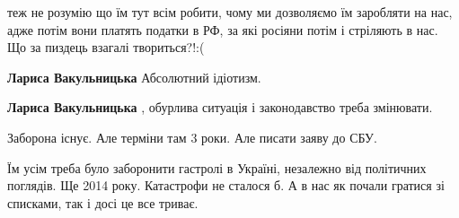\begin{itemize}
 

теж не розумію що їм тут всім робити, чому ми дозволяємо їм заробляти на нас,
адже потім вони платять податки в РФ, за які росіяни потім і стріляють в нас.
Що за пиздець взагалі твориться?!:(

\begin{itemize}
 
\textbf{Лариса Вакульницька} Абсолютний ідіотизм.

 
\textbf{Лариса Вакульницька} , обурлива ситуація і законодавство треба змінювати.
\end{itemize}

 
Заборона існує. Але терміни там 3 роки. Але писати заяву до СБУ.

 

Їм усім треба було заборонити гастролі в Україні, незалежно від політичних
поглядів. Ще 2014 року. Катастрофи не сталося б. А в нас як почали гратися зі
списками, так і досі це все триває.


 


\end{itemize}
